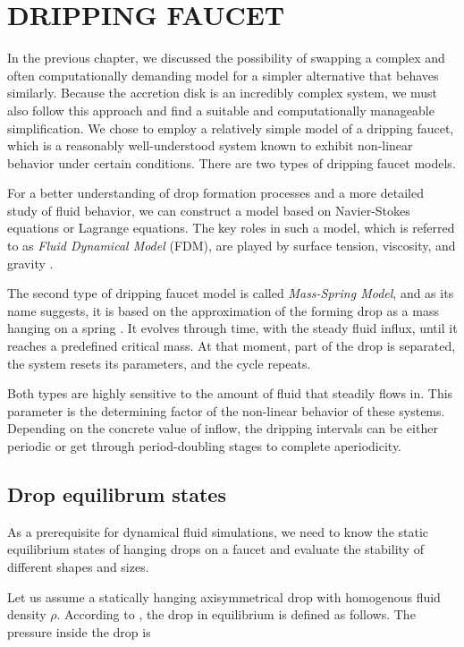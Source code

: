 \chapter{DRIPPING FAUCET}
\label{chap:dripping_faucet}
    In the previous chapter, we discussed the possibility of swapping a complex and often computationally demanding model for a simpler alternative that behaves similarly. Because the accretion disk is an incredibly complex system, we must also follow this approach and find a suitable and computationally manageable simplification. We chose to employ a relatively simple model of a dripping faucet, which is a reasonably well-understood system known to exhibit non-linear behavior under certain conditions. There are two types of dripping faucet models. 

    For a better understanding of drop formation processes and a more detailed study of fluid behavior, we can construct a model based on Navier-Stokes equations or Lagrange equations. The key roles in such a model, which is referred to as \emph{Fluid Dynamical Model} (FDM), are played by surface tension, viscosity, and gravity \parencite{faucet1999}.   

    The second type of dripping faucet model is called \emph{Mass-Spring Model}, and as its name suggests, it is based on the approximation of the forming drop as a mass hanging on a spring \citep{shaw1984}. It evolves through time, with the steady fluid influx, until it reaches a predefined critical mass. At that moment, part of the drop is separated, the system resets its parameters, and the cycle repeats. 

    Both types are highly sensitive to the amount of fluid that steadily flows in. This parameter is the determining factor of the non-linear behavior of these systems. Depending on the concrete value of inflow, the dripping intervals can be either periodic or get through period-doubling stages to complete aperiodicity. 

\section{Drop equilibrum states}
    \label{sec:drop_equilibrium_states}
    As a prerequisite for dynamical fluid simulations, we need to know the static equilibrium states of hanging drops on a faucet and evaluate the stability of different shapes and sizes. 

    Let us assume a statically hanging axisymmetrical drop with homogenous fluid density $\rho$. According to \citep{faucet1999}, the drop in equilibrium is defined as follows. The pressure inside the drop is 
    
